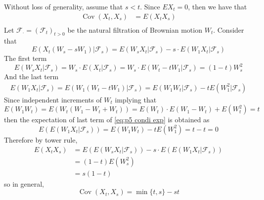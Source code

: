 \documentclass{homework}
\DeclareMathOperator{\cov}{Cov}
\begin{document}
    \problem

    \problem
    \begin{subproblem}
        \item
        Without loss of generality, assume that $s<t$.
        Since $EX_t=0$, then we have that
        \[\begin{aligned}
            \cov(X_t,X_s)&=E(X_tX_s)\\
        \end{aligned}\]
        Let $\mathcal F_\cdot=(\mathcal F_t)_{t>0}$ be
        the natural filtration of Brownian motion
        $W_t$. Consider that
        \begin{equation}
            \label{eq:p5 condi exp}
            E(X_t(W_s-sW_1)|\mathcal F_s)
            =E(W_sX_t|\mathcal F_s)
            -s\cdot E(W_1X_t|\mathcal F_s)
        \end{equation}
        The first term
        \[E(W_sX_t|\mathcal F_s)=W_s\cdot E(X_t|\mathcal F_s)
        =W_s\cdot E(W_t-tW_1|\mathcal F_s)=(1-t)W_s^2\]
        And the last term
        \begin{equation*}
            \begin{aligned}
                E(W_1X_t|\mathcal F_s)
                =E(W_1(W_t-tW_1)|\mathcal F_s)
                =E(W_1W_t|\mathcal F_s)-tE(W_1^2|\mathcal F_s)
            \end{aligned}
        \end{equation*}
        Since independent increments of $W_t$ implying that
        \[E(W_1W_t)=E(W_t(W_1-W_t+W_t))=E(W_t)\cdot E(W_1-W_t)+E(W_t^2)=t\]
        then the expectation of last term of \cref{eq:p5 condi exp}
        is obtained as
        \[E(E(W_1X_t|\mathcal F_s))=E(W_1W_t)-tE(W_1^2)=t-t=0\]
        Therefore by tower rule,
        \[\begin{aligned}
            E(X_tX_s)&=E(E(W_sX_t|\mathcal F_s))-s\cdot E(E(W_1X_t|\mathcal F_s))\\
            &=(1-t)E(W_s^2)\\
            &=s(1-t)
        \end{aligned}\]
        so in general,
        \begin{equation}
            \label{eq:p5 cov}
            \cov(X_t,X_s)=\min\{t,s\}-st
        \end{equation}


\end{subproblem}
\end{document}

